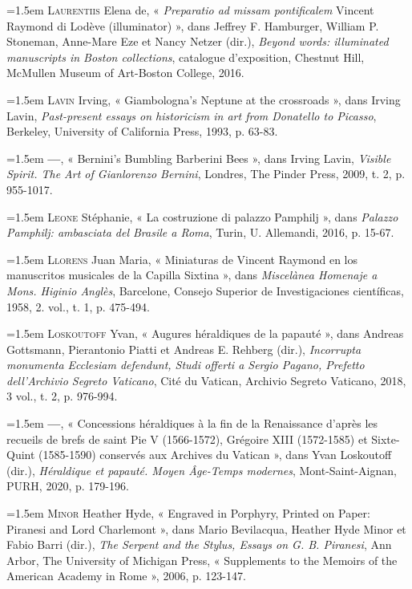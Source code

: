 \documentclass[12pt,twoside,openany]{book}
\newenvironment{PurhBibliography}
  {%
    \par
    \setlength{\parindent}{0pt}%
    \setlength{\leftskip}{0pt}%
  }
  {%
    \par
  }
\begin{document}
\begin{PurhBibliography}
\noindent\hangindent=1.5em \textsc{Laurentiis} Elena de, « \textit{Preparatio ad missam pontificalem }Vincent Raymond di Lodève (illuminator) », dans Jeffrey F. Hamburger, William P. Stoneman, Anne-Mare Eze et Nancy Netzer (dir.), \textit{Beyond words: illuminated manuscripts in Boston collections}, catalogue d’exposition, Chestnut Hill, McMullen Museum of Art-Boston College, 2016.\par
\noindent\hangindent=1.5em \textsc{Lavin} Irving, « Giambologna’s Neptune at the crossroads », dans Irving Lavin, \textit{Past-present essays on historicism in art from Donatello to Picasso}, Berkeley, University of California Press, 1993, p. 63-83.\par
\noindent\hangindent=1.5em \textbf{—}, « Bernini’s Bumbling Barberini Bees », dans Irving Lavin, \textit{Visible Spirit. The Art of Gianlorenzo Bernini}, Londres, The Pinder Press, 2009, t. 2, p. 955-1017.\par
\noindent\hangindent=1.5em \textsc{Leone} Stéphanie, « La costruzione di palazzo Pamphilj », dans \textit{Palazzo Pamphilj: ambasciata del Brasile a Roma}, Turin, U. Allemandi, 2016, p. 15-67. \par
\noindent\hangindent=1.5em \textsc{Llorens} Juan Maria, « Miniaturas de Vincent Raymond en los manuscritos musicales de la Capilla Sixtina », dans \textit{Miscelànea Homenaje a Mons. Higinio Anglès}, Barcelone, Consejo Superior de Investigaciones científicas, 1958, 2. vol., t. 1, p. 475-494.\par
\noindent\hangindent=1.5em \textsc{Loskoutoff} Yvan, « Augures héraldiques de la papauté », dans Andreas Gottsmann, Pierantonio Piatti et Andreas E. Rehberg (dir.), \textit{Incorrupta monumenta Ecclesiam defendunt, Studi offerti a Sergio Pagano, Prefetto dell’Archivio Segreto Vaticano}, Cité du Vatican, Archivio Segreto Vaticano, 2018, 3 vol., t. 2, p. 976-994.\par
\noindent\hangindent=1.5em \textbf{—}, « Concessions héraldiques à la fin de la Renaissance d’après les recueils de brefs de saint Pie V (1566-1572), Grégoire \textsc{XIII} (1572-1585) et Sixte-Quint (1585-1590) conservés aux Archives du Vatican », dans Yvan Loskoutoff (dir.), \textit{Héraldique et papauté. Moyen Âge-Temps modernes}, Mont-Saint-Aignan, PURH, 2020, p. 179-196.\par
\noindent\hangindent=1.5em \textsc{Minor} Heather Hyde, « Engraved in Porphyry, Printed on Paper: Piranesi and Lord Charlemont », dans Mario Bevilacqua, Heather Hyde Minor et Fabio Barri (dir.), \textit{The Serpent and the Stylus, Essays on G. B. Piranesi}, Ann Arbor, The University of Michigan Press, « Supplements to the Memoirs of the American Academy in Rome », 2006, p. 123-147.\par

\end{PurhBibliography}
\end{document}
